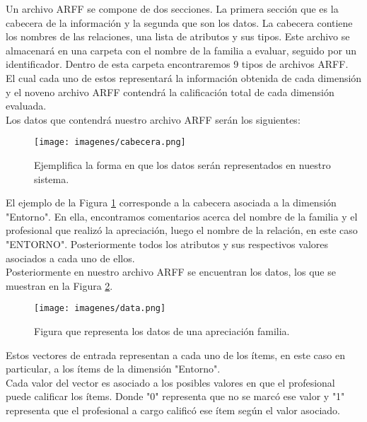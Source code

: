Un archivo ARFF se compone de dos secciones. La primera sección que es la cabecera de la información y la segunda que son los datos. La cabecera contiene los nombres de las relaciones, una lista de atributos y sus tipos. Este archivo se almacenará en una carpeta con el nombre de la familia a evaluar, seguido por un identificador. Dentro de esta carpeta encontraremos 9 tipos de archivos ARFF. \\

El cual cada uno de estos representará la información obtenida de cada dimensión y el noveno archivo ARFF contendrá la calificación total de cada dimensión evaluada.\\
Los datos que contendrá nuestro archivo ARFF serán los siguientes:

\begin{figure}[htb]
	\label{cabecera}
	\begin{center}
		\texttt{[image: imagenes/cabecera.png]}
		\caption{Ejemplifica la forma en que los datos serán representados en nuestro sistema.}
	\end{center}
\end{figure}

El ejemplo de la Figura \ref{cabecera} corresponde a la cabecera asociada a la dimensión "Entorno". En ella, encontramos comentarios acerca del nombre de la familia y el profesional que realizó la apreciación, luego el nombre de la relación, en este caso "ENTORNO". Posteriormente todos los atributos y sus respectivos valores asociados a cada uno de ellos.\\

Posteriormente en nuestro archivo ARFF se encuentran los datos, los que se muestran en la Figura \ref{data}. 

\begin{figure}[h!]
	\label{data}
	\begin{center}
		\texttt{[image: imagenes/data.png]}
		\caption{Figura que representa los datos de una apreciación familia.}
	\end{center}
\end{figure}

Estos vectores de entrada representan a cada uno de los ítems, en este caso en particular, a los ítems de la dimensión "Entorno". \\
Cada valor del vector es asociado a los posibles valores en que el profesional puede calificar los ítems. Donde "0" representa que no se marcó ese valor y "1" representa que el profesional a cargo calificó ese ítem según el valor asociado. 

